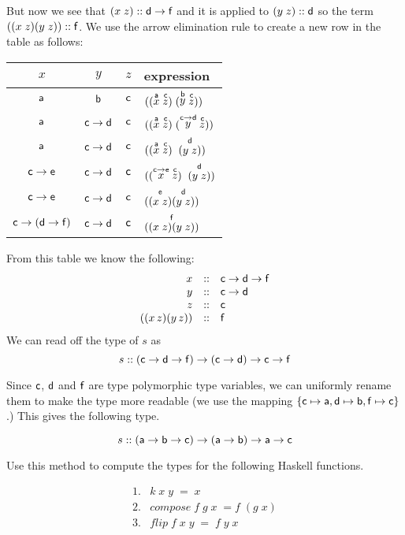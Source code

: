\documentclass[11pt]{article}
\begin{document}
But now we see that $(x\;z)::{\sf{d}}\rightarrow{\sf{f}}$ and it is applied to
$(y\;z)::{\sf{d}}$ so the term $((x\;z)(y\;z))::{\sf{f}}$.  We use the arrow
elimination rule to create a new row in the table as follows:
\begin{center}
\begin{tabular}{ccc|l}
$x$ & $y$ & $z$ & expression \\\hline{}
${\sf{a}}$ & ${\sf{b}}$ & ${\sf{c}}$ &$((\stackrel{{\sf{a}}}{x} \; \stackrel{{\sf{c}}}{z})\; (\stackrel{{\sf{b}}}{y} \; \stackrel{{\sf{c}}}{z}))$ \\
${\sf{a}}$ & ${\sf{c}}\rightarrow{}{\sf{d}}$ & ${\sf{c}}$ &$((\stackrel{{\sf{a}}}{x} \; \stackrel{{\sf{c}}}{z})\; (\stackrel{{\sf{c}}\rightarrow{}{\sf{d}}}{y} \; \stackrel{{\sf{c}}}{z}))$ \\
${\sf{a}}$ & ${\sf{c}}\rightarrow{}{\sf{d}}$ & ${\sf{c}}$ &$((\stackrel{{\sf{a}}}{x} \; \stackrel{{\sf{c}}}{z})\; \stackrel{{\sf{d}}}{(y\;z)})$ \\
${\sf{c}}\rightarrow{\sf{e}}$ & ${\sf{c}}\rightarrow{}{\sf{d}}$ & ${\sf{c}}$ &$((\stackrel{{\sf{c}}\rightarrow{\sf{e}}}{x} \; \stackrel{{\sf{c}}}{z})\; \stackrel{{\sf{d}}}{(y\;z)})$ \\
${\sf{c}}\rightarrow{\sf{e}}$ & ${\sf{c}}\rightarrow{}{\sf{d}}$ & ${\sf{c}}$ &$(\stackrel{{\sf{e}}}{(x\;z)} \stackrel{{\sf{d}}}{(y\;z)})$ \\
${\sf{c}}\rightarrow({\sf{d}}\rightarrow{}{\sf{f}})$ & ${\sf{c}}\rightarrow{}{\sf{d}}$ & ${\sf{c}}$ &$\stackrel{{\sf{f}}}{((x\;z)(y\;z))}$ \\
\end{tabular}
\end{center}

From this table we know the following:
\[\begin{array}{rcl}
x & :: & {\sf{c}}\rightarrow{\sf{d}}\rightarrow{\sf{f}} \\
y & :: & {\sf{c}}\rightarrow{\sf{d}}\\
z & :: & {\sf{c}} \\
((x\,z)(y\,z)) & :: & {\sf{f}}
\end{array}\]
We can read off the type of $s$ as
\[s::({\sf{c}}\rightarrow{}{\sf{d}}\rightarrow{}{\sf{f}})\rightarrow({\sf{c}}\rightarrow{}{\sf{d}})\rightarrow {\sf{c}} \rightarrow{}{\sf{f}}\]

Since ${\sf{c}}$, ${\sf{d}}$ and ${\sf{f}}$ are type polymorphic type variables, we can
uniformly rename them to make the type more readable (we use the mapping
$\{{\sf{c}}\mapsto{\sf{a}},{\sf{d}}\mapsto{\sf{b}},{\sf{f}}\mapsto{\sf{c}}\}$.) This gives the following
type.

\[s::({\sf{a}}\rightarrow{}{\sf{b}}\rightarrow{}{\sf{c}})\rightarrow({\sf{a}}\rightarrow{}{\sf{b}})\rightarrow {\sf{a}} \rightarrow{}{\sf{c}}\]


\begin{problem}
Use this method to compute the types for the following Haskell functions.

\[\begin{array}{ll}
1. & k\;x\;y\;=\;x \\
2. & {\mathit{compose}} \;f\; g\; x \;= f\; (g \;x)\\
3. & {\mathit{flip}}\;f\;x\;y\;=\;f\;y\;x
\end{array}\]


\end{problem}
\end{document}
